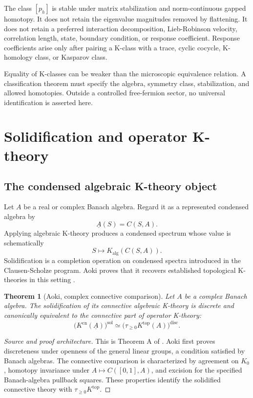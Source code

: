 \documentclass[12pt]{article}
\newtheorem{theorem}{Theorem}[section]
\theoremstyle{definition}
\theoremstyle{remark}
\newcommand{\Kalg}{K_{\mathrm{alg}}}
\newcommand{\Ktop}{K^{\mathrm{top}}}
\begin{document}
The class $[p_h]$ is stable under matrix stabilization and norm-continuous gapped
homotopy.  It does not retain the eigenvalue magnitudes removed by flattening.  It
does not retain a preferred interaction decomposition, Lieb-Robinson velocity,
correlation length, state, boundary condition, or response coefficient.  Response
coefficients arise only after pairing a K-class with a trace, cyclic cocycle,
K-homology class, or Kasparov class.

Equality of K-classes can be weaker than the microscopic equivalence relation.  A
classification theorem must specify the algebra, symmetry class, stabilization, and
allowed homotopies.  Outside a controlled free-fermion sector, no universal
identification is asserted here.

\section{Solidification and operator K-theory}

\subsection{The condensed algebraic K-theory object}

Let $A$ be a real or complex Banach algebra.  Regard it as a represented condensed
algebra by
\[
\underline A(S)=C(S,A).
\]
Applying algebraic K-theory produces a condensed spectrum whose value is
schematically
\[
S\longmapsto\Kalg(C(S,A)).
\]
Solidification is a completion operation on condensed spectra introduced in the
Clausen-Scholze program.  Aoki proves that it recovers established topological
K-theories in this setting \cite{Aoki}.

\begin{theorem}[Aoki, complex connective comparison]\label{thm:aoki-complex}
Let $A$ be a complex Banach algebra.  The solidification of its connective algebraic
K-theory is discrete and canonically equivalent to the connective part of operator
K-theory:
\[
\bigl(K^{\mathrm{cn}}(\underline A)\bigr)^{\mathrm{sol}}
\simeq
\bigl(\tau_{\geq0}\Ktop(A)\bigr)^{\mathrm{disc}}.
\]
\end{theorem}

\begin{proof}[Source and proof architecture]
This is Theorem A of \cite{Aoki}.  Aoki first proves discreteness under openness of
the general linear groups, a condition satisfied by Banach algebras.  The connective
comparison is characterized by agreement on $K_0$, homotopy invariance under
$A\mapsto C([0,1],A)$, and excision for the specified Banach-algebra pullback
squares.  These properties identify the solidified connective theory with
$\tau_{\geq0}\Ktop$.
\end{proof}
\end{document}
